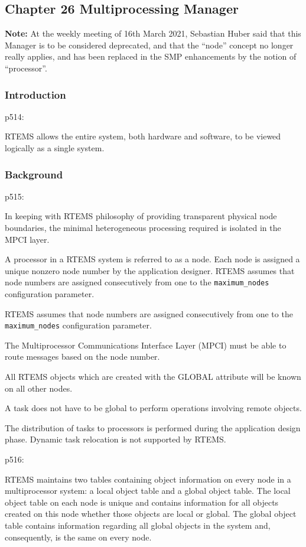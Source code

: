 \subsection{Chapter 26 Multiprocessing Manager}

\textbf{Note:}
\textsf{
At the weekly meeting of 16th March 2021,
Sebastian Huber said that this Manager is to be
considered deprecated,
and that the ``node'' concept no longer really applies,
and has been replaced in the SMP enhancements by the
notion of ``processor''.
}

\subsubsection{Introduction}

p514:

RTEMS allows the entire system,
both hardware and software,
to be viewed logically as a single system.

\subsubsection{Background}

p515:

In keeping with RTEMS philosophy
of providing transparent physical node boundaries,
the minimal heterogeneous processing required is isolated in the MPCI layer.

A processor in a RTEMS system is referred to as a node.
Each node is assigned a unique nonzero node number by the application designer.
RTEMS assumes that node numbers are assigned consecutively
from one to the \verb"maximum_nodes" configuration parameter.

RTEMS assumes that node numbers are assigned
consecutively from one to the \verb"maximum_nodes" configuration parameter.

The Multiprocessor Communications Interface Layer (MPCI)
must be able to route messages based on the node number.

All RTEMS objects which are created with the GLOBAL attribute
will be known on all other nodes.

A task does not have to be global
to perform operations involving remote objects.

The distribution of tasks to processors is performed
during the application design phase.
Dynamic task relocation is not supported by RTEMS.

p516:

RTEMS maintains two tables containing object information
on every node in a multiprocessor system:
a local object table and a global object table.
The local object table on each node is unique
and contains information for all objects created on this node
whether those objects are local or global.
The global object table contains information regarding
all global objects in the system and, consequently, is the same on every node.

